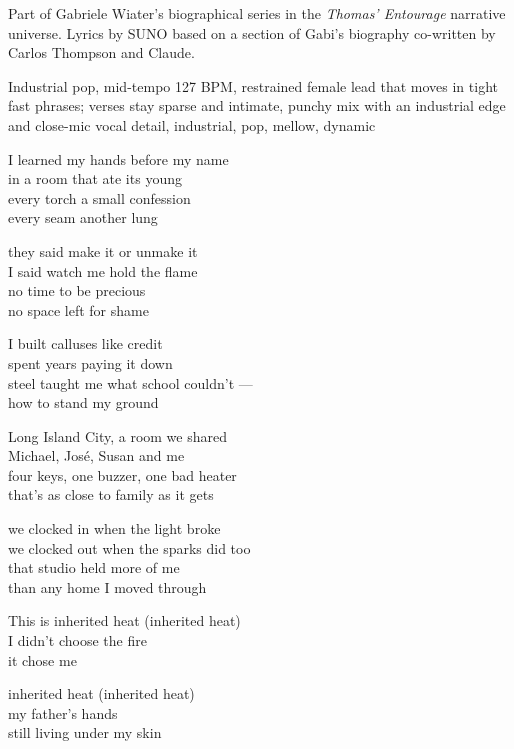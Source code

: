 
\begin{notes}
Part of Gabriele Wiater's biographical series in the \emph{Thomas’ Entourage} narrative universe. Lyrics by SUNO based on a section of Gabi's biography co-written by Carlos Thompson and Claude.
\end{notes}
\begin{style}
Industrial pop, mid-tempo 127 BPM, restrained female lead that moves in tight fast phrases; verses stay sparse and intimate, punchy mix with an industrial edge and close-mic vocal detail, industrial, pop, mellow, dynamic
\end{style}
\begin{lyrics}

I learned my hands before my name\\
in a room that ate its young\\
every torch a small confession\\
every seam another lung

they said make it or unmake it\\
I said watch me hold the flame\\
no time to be precious\\
no space left for shame

I built calluses like credit\\
spent years paying it down\\
steel taught me what school couldn't —\\
how to stand my ground

Long Island City, a room we shared\\
Michael, José, Susan and me\\
four keys, one buzzer, one bad heater\\
that's as close to family as it gets

we clocked in when the light broke\\
we clocked out when the sparks did too\\
that studio held more of me\\
than any home I moved through

This is inherited heat
(inherited heat)\\
I didn't choose the fire\\
it chose me

inherited heat
(inherited heat)\\
my father's hands\\
still living under my skin


\end{lyrics}
